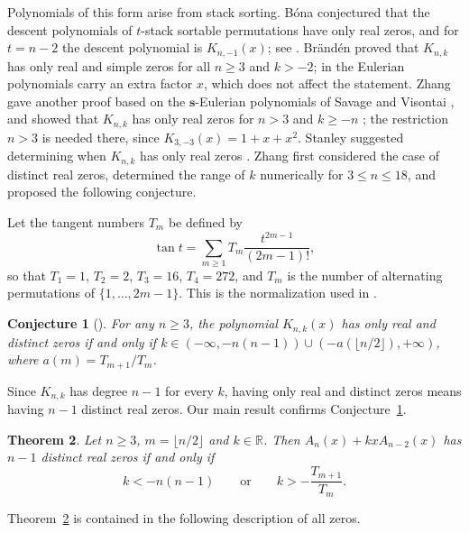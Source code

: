 \documentclass{amsart}
\newtheorem{theorem}{Theorem}[section]
\newtheorem{conjecture}[theorem]{Conjecture}
\theoremstyle{remark}
\numberwithin{equation}{section}
\newcommand{\RR}{\mathbb{R}}
\begin{document}
Polynomials of this form arise from stack sorting. B\'ona \cite{Bona} conjectured
that the descent polynomials of $t$-stack sortable permutations have only
real zeros, and for $t=n-2$ the descent polynomial is $K_{n,-1}(x)$; see
\cite[Section 1]{Zhang}. Br\"and\'en \cite[Theorem 5.2]{Branden} proved that $K_{n,k}$ has only real and simple zeros
for all $n\ge 3$ and $k>-2$; in \cite{Branden} the Eulerian polynomials carry an extra
factor $x$, which does not affect the statement. Zhang \cite{Zhang} gave another
proof based on the $\mathbf{s}$-Eulerian polynomials of Savage and Visontai
\cite{SavageVisontai}, and showed that $K_{n,k}$ has only real zeros for $n>3$ and $k\ge -n$
\cite[Theorem 1.3]{Zhang}; the restriction $n>3$ is needed there, since
$K_{3,-3}(x)=1+x+x^2$. Stanley suggested determining when $K_{n,k}$ has only
real zeros \cite[Section 3]{Zhang}. Zhang first considered the case of
distinct real zeros, determined the range of $k$ numerically for
$3\le n\le 18$, and proposed the following conjecture.

Let the tangent numbers $T_m$ be defined by
\begin{equation}\label{eq:tangent}
\tan t=\sum_{m\ge 1}T_m\frac{t^{2m-1}}{(2m-1)!},
\end{equation}
so that $T_1=1$, $T_2=2$, $T_3=16$, $T_4=272$, and $T_m$ is the number of
alternating permutations of $\{1,\dots,2m-1\}$. This is the normalization
used in \cite{Zhang}.

\begin{conjecture}[{\cite[Conjecture 3.2]{Zhang}}]\label{conj:Zhang}
For any $n\ge 3$, the polynomial $K_{n,k}(x)$ has only real and distinct
zeros if and only if $k\in(-\infty,-n(n-1))\cup(-a(\lfloor n/2\rfloor),
+\infty)$, where $a(m)=T_{m+1}/T_m$.
\end{conjecture}

Since $K_{n,k}$ has degree $n-1$ for every $k$, having only real and
distinct zeros means having $n-1$ distinct real zeros. Our main result
confirms Conjecture~\ref{conj:Zhang}.

\begin{theorem}\label{thm:main}
Let $n\ge 3$, $m=\lfloor n/2\rfloor$ and $k\in\RR$. Then $A_n(x)+kxA_{n-2}(x)$
has $n-1$ distinct real zeros if and only if
\[
k<-n(n-1)\qquad\text{or}\qquad k>-\frac{T_{m+1}}{T_m}.
\]
\end{theorem}

Theorem~\ref{thm:main} is contained in the following description of all
zeros.
\end{document}

